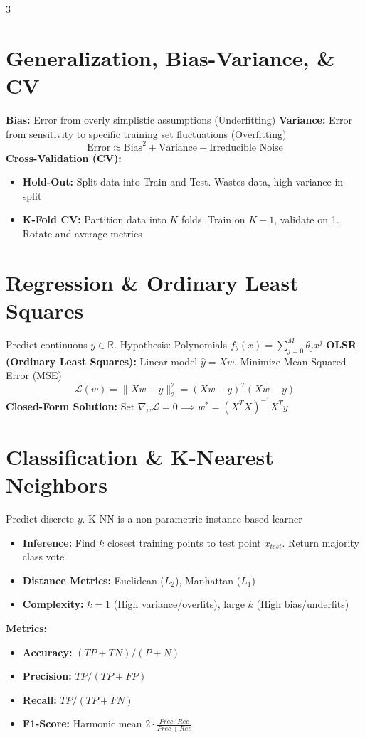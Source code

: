 \documentclass[8pt,landscape]{extarticle}
\begin{document}
\begin{multicols*}{3}
\section{Generalization, Bias-Variance, \& CV}
\textbf{Bias:} Error from overly simplistic assumptions (Underfitting) %
\textbf{Variance:} Error from sensitivity to specific training set fluctuations (Overfitting) %
$$ \text{Error} \approx \text{Bias}^2 + \text{Variance} + \text{Irreducible Noise} $$ %
\textbf{Cross-Validation (CV):}
\begin{itemize}
    \item \textbf{Hold-Out:} Split data into Train and Test. Wastes data, high variance in split %
    \item \textbf{K-Fold CV:} Partition data into $K$ folds. Train on $K-1$, validate on 1. Rotate and average metrics %
\end{itemize}

\section{Regression \& Ordinary Least Squares}
Predict continuous $y \in \mathbb{R}$. Hypothesis: Polynomials $f_\theta(x) = \sum_{j=0}^M \theta_j x^j$ %
\textbf{OLSR (Ordinary Least Squares):} Linear model $\hat{y} = Xw$. Minimize Mean Squared Error (MSE) %
$$ \mathcal{L}(w) = \|Xw - y\|^2_2 = (Xw - y)^T(Xw - y) $$ %
\textbf{Closed-Form Solution:} Set $\nabla_w \mathcal{L} = 0 \implies w^* = (X^T X)^{-1} X^T y$ %

\section{Classification \& K-Nearest Neighbors}
Predict discrete $y$. K-NN is a non-parametric instance-based learner %
\begin{itemize}
    \item \textbf{Inference:} Find $k$ closest training points to test point $x_{test}$. Return majority class vote %
    \item \textbf{Distance Metrics:} Euclidean ($L_2$), Manhattan ($L_1$) %
    \item \textbf{Complexity:} $k=1$ (High variance/overfits), large $k$ (High bias/underfits) %
\end{itemize}
\textbf{Metrics:}
\begin{itemize}
    \item \textbf{Accuracy:} $(TP + TN) / (P + N)$ %
    \item \textbf{Precision:} $TP / (TP + FP)$ %
    \item \textbf{Recall:} $TP / (TP + FN)$ %
    \item \textbf{F1-Score:} Harmonic mean $2 \cdot \frac{Prec \cdot Rec}{Prec + Rec}$ %
\end{itemize}


\end{multicols*}
\end{document}
